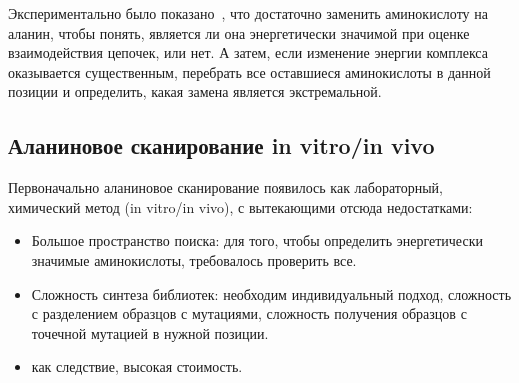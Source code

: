  Экспериментально было показано~\cite{alascan2001}, что достаточно заменить аминокислоту на аланин, чтобы понять, является ли она энергетически значимой при оценке взаимодействия цепочек, или нет. А затем, если изменение энергии комплекса \ddG  оказывается существенным, перебрать все оставшиеся аминокислоты в данной позиции и определить, какая замена является экстремальной.

\begin{figure}
\end{figure}
\newpage
\subsection{Аланиновое сканирование in vitro/in vivo}
Первоначально аланиновое сканирование появилось как лабораторный, химический метод (in vitro/in vivo), с вытекающими отсюда недостатками:
\begin{itemize}
\item Большое пространство поиска: для того, чтобы определить энергетически значимые аминокислоты, требовалось проверить все.
\item Сложность синтеза библиотек: необходим индивидуальный подход, сложность с разделением образцов с мутациями, сложность получения образцов с точечной мутацией в нужной позиции.
\item как следствие, высокая стоимость.
\end{itemize}

